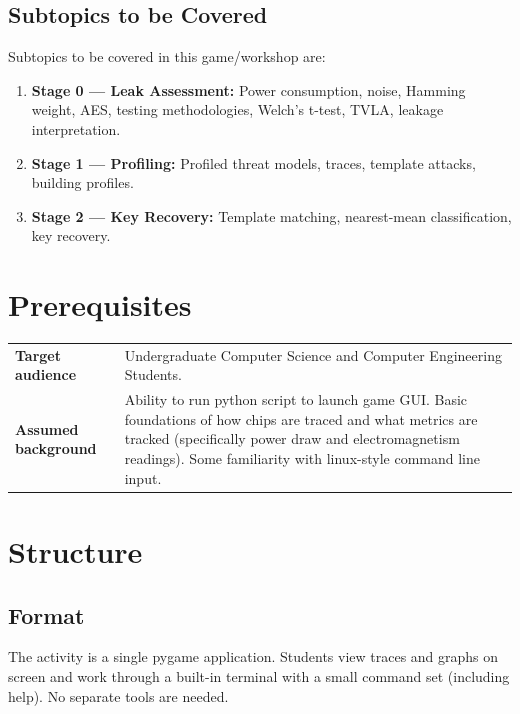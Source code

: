\documentclass[11pt]{article}
\begin{document}
\subsection{Subtopics to be Covered}
Subtopics to be covered in this game/workshop are:
\begin{enumerate}[label=\arabic*.]
  \item \textbf{Stage 0 --- Leak Assessment:} Power consumption, noise, Hamming weight, AES, testing methodologies, Welch's t-test, TVLA, leakage interpretation.
  \item \textbf{Stage 1 --- Profiling:} Profiled threat models, traces, template attacks, building profiles.
  \item \textbf{Stage 2 --- Key Recovery:} Template matching, nearest-mean classification, key recovery.
\end{enumerate}
\section{Prerequisites}
 
\begin{tabularx}{\linewidth}{@{}l X@{}}
  \toprule
  \textbf{Target audience} & Undergraduate Computer Science and Computer Engineering Students. \\
  \textbf{Assumed background} & Ability to run python script to launch game GUI. Basic foundations of how chips are traced and what metrics are tracked (specifically power draw and electromagnetism readings). Some familiarity with linux-style command line input. \\
  \bottomrule
\end{tabularx}
 
\section{Structure}
 
\subsection{Format}
The activity is a single pygame application. Students view traces and graphs on screen and work through a built-in terminal with a small command set (including help). No separate tools are needed.
\end{document}
